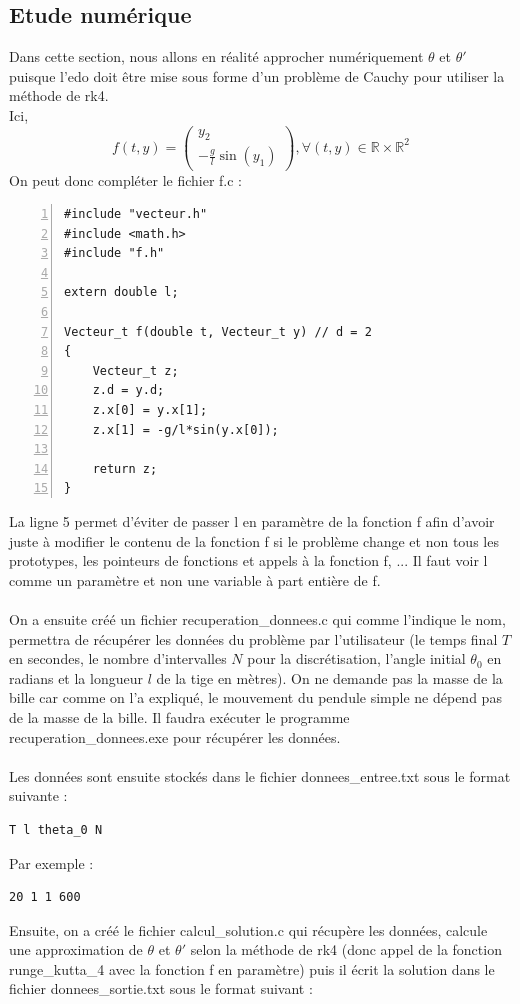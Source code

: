 \documentclass[9pt,a4paper]{article}
\begin{document}
\subsection{Etude numérique}
Dans cette section, nous allons en réalité approcher numériquement $\theta$ et $\theta'$ puisque l'\gls{edo} doit être mise sous forme d'un problème de Cauchy pour utiliser la méthode de \gls{rk4}.\\
Ici,
$$
f(t, y) = \begin{pmatrix}
    y_2\\
    -\frac{g}{l}\sin(y_1)
\end{pmatrix}, \forall (t, y) \in \mathbb{R} \times \mathbb{R}^2
$$
On peut donc compléter le fichier f.c :
\begin{Verbatim}[numbers=left, frame=single]
#include "vecteur.h"
#include <math.h>
#include "f.h"

extern double l;

Vecteur_t f(double t, Vecteur_t y) // d = 2
{
    Vecteur_t z;
    z.d = y.d;
    z.x[0] = y.x[1];
    z.x[1] = -g/l*sin(y.x[0]);

    return z;
}
\end{Verbatim}
La ligne 5 permet d'éviter de passer l en paramètre de la fonction f afin d'avoir juste à modifier le contenu de la fonction f si le problème change et non tous les prototypes, les pointeurs de fonctions et appels à la fonction f, ... Il faut voir l comme un paramètre et non une variable à part entière de f.\\\\
On a ensuite créé un fichier recuperation\_donnees.c qui comme l'indique le nom, permettra de récupérer les données du problème par l'utilisateur (le temps final $T$ en secondes, le nombre d'intervalles $N$ pour la discrétisation, l'angle initial $\theta_0$ en radians et la longueur $l$ de la tige en mètres). On ne demande pas la masse de la bille car comme on l'a expliqué, le mouvement du pendule simple ne dépend pas de la masse de la bille. Il faudra exécuter le programme recuperation\_donnees.exe pour récupérer les données.\\\\
Les données sont ensuite stockés dans le fichier donnees\_entree.txt sous le format suivante :
\begin{Verbatim}
T l theta_0 N
\end{Verbatim}
Par exemple :
\begin{Verbatim}
20 1 1 600
\end{Verbatim}
Ensuite, on a créé le fichier calcul\_solution.c qui récupère les données, calcule une approximation de $\theta$ et $\theta'$ selon la méthode de \gls{rk4} (donc appel de la fonction runge\_kutta\_4 avec la fonction f en paramètre) puis il écrit la solution dans le fichier donnees\_sortie.txt sous le format suivant :
\end{document}

